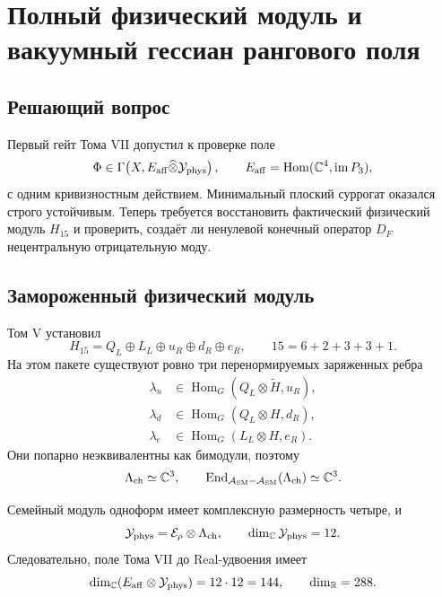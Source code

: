 \chapter{Полный физический модуль и вакуумный гессиан рангового поля}

\section{Решающий вопрос}

Первый гейт Тома VII допустил к проверке поле
\begin{equation}
 \Phi\in\Gamma\!\left(
 X,E_{\rm aff}\widehat\otimes\mathcal Y_{\rm phys}
 \right),
 \qquad
 E_{\rm aff}=\operatorname{Hom}(\mathbb C^4,\operatorname{im}P_3),
\end{equation}
с одним кривизностным действием. Минимальный плоский суррогат оказался
строго устойчивым. Теперь требуется восстановить фактический физический
модуль $H_{15}$ и проверить, создаёт ли ненулевой конечный оператор $D_F$
нецентральную отрицательную моду.

\section{Замороженный физический модуль}

Том V установил
\begin{equation}
 H_{15}=Q_L\oplus L_L\oplus u_R\oplus d_R\oplus e_R,
 \qquad
 15=6+2+3+3+1.
\end{equation}
На этом пакете существуют ровно три перенормируемых заряженных ребра
\begin{align}
 \lambda_u&\in\operatorname{Hom}_G(Q_L\otimes\widetilde H,u_R),\\
 \lambda_d&\in\operatorname{Hom}_G(Q_L\otimes H,d_R),\\
 \lambda_e&\in\operatorname{Hom}_G(L_L\otimes H,e_R).
\end{align}
Они попарно неэквивалентны как бимодули, поэтому
\begin{equation}
 \Lambda_{\rm ch}\simeq\mathbb C^3,
 \qquad
 \operatorname{End}_{\mathcal A_{\rm SM}-\mathcal A_{\rm SM}}
 (\Lambda_{\rm ch})\simeq\mathbb C^3.
 \label{eq:v7-h15-edge-commutant}
\end{equation}

Семейный модуль одноформ имеет комплексную размерность четыре, и
\begin{equation}
 \mathcal Y_{\rm phys}
 =\mathcal E_\rho\otimes\Lambda_{\rm ch},
 \qquad
 \dim_{\mathbb C}\mathcal Y_{\rm phys}=12.
\end{equation}
Следовательно, поле Тома VII до Real-удвоения имеет
\begin{equation}
 \dim_{\mathbb C}
 (E_{\rm aff}\otimes\mathcal Y_{\rm phys})
 =12\cdot12=144,
 \qquad
 \dim_{\mathbb R}=288.
 \label{eq:v7-full-rank-field-dimension}
\end{equation}

